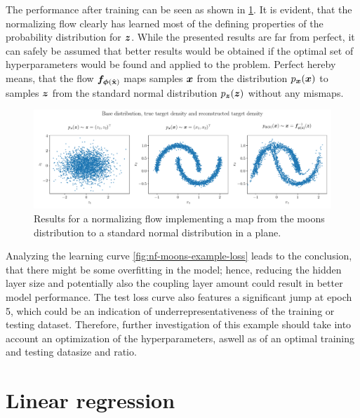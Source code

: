 \documentclass[a4paper,12pt]{report}
\begin{document}
The performance after training can be seen as shown in \cref{fig:nf-moons-example-plots}. It is evident, that the normalizing flow clearly has learned most of the defining properties of the probability distribution for $\bm{z}$. While the presented results are far from perfect, it can safely be assumed that better results would be obtained if the optimal set of hyperparameters would be found and applied to the problem. Perfect hereby means, that the flow $\bm{f}_{\bm{\phi}(\hat{\boldsymbol{\mathbf{x}}})}$ maps samples $\bm{x}$ from the distribution $p_{\bm{x}}(\bm{x})$ to samples $\bm{z}$ from the standard normal distribution $p_{\bm{z}}(\bm{z})$ without any mismaps.
\begin{figure}[h!]
\centering
\includegraphics[width=\textwidth]{figures/nf-moons-example-plots.pdf}
\caption{Results for a normalizing flow implementing a map from the moons distribution to a standard normal distribution in a plane.}
\label{fig:nf-moons-example-plots}
\end{figure}
Analyzing the learning curve \cref{fig:nf-moons-example-loss} leads to the conclusion, that there might be some overfitting in the model; hence, reducing the hidden layer size and potentially also the coupling layer amount could result in better model performance. The test loss curve also features a significant jump at epoch 5, which could be an indication of underrepresentativeness of the training or testing dataset. Therefore, further investigation of this example should take into account an optimization of the hyperparameters, aswell as of an optimal training and testing datasize and ratio.

\FloatBarrier
\section{Linear regression}
\end{document}
